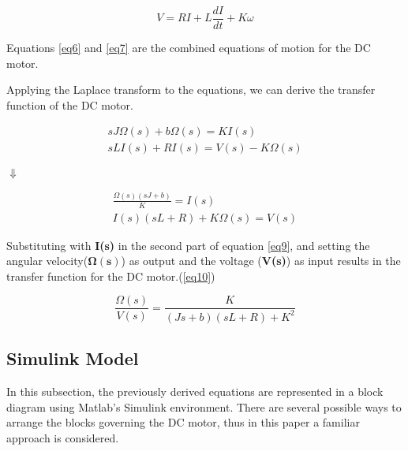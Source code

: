 \begin{equation} \label{eq7}
V = RI + L\frac{dI}{dt} + K\omega
\end{equation}

Equations \ref{eq6} and \ref{eq7} are the combined equations of motion for the DC motor.

Applying the Laplace transform to the equations, we can derive the transfer function of the DC motor.

\begin{align}  
sJ\Omega(s) + b\Omega(s) = KI(s) \label{eq8}\\
sLI(s) + RI(s) = V(s) - K\Omega(s) \nonumber
\end{align}

\begin{center}
$\Downarrow$
\end{center}

\begin{align} 
\frac{\Omega(s)(sJ + b)}{K} = I(s) \label{eq9} \\
I(s)(sL + R) + K\Omega(s) = V(s)  \nonumber 
\end{align}

Substituting with \textbf{I(s)} in the second part of equation \ref{eq9}, and setting the angular velocity($\boldsymbol{\Omega(s)}$) as output and the voltage (\textbf{V(s)}) as input results in the transfer function for the DC motor.(\ref{eq10})

\begin{equation} \label{eq10}
\frac{\Omega(s)}{V(s)} = \frac{K}{(Js + b)(sL + R) + K^2}
\end{equation}

\subsection{Simulink Model} \label{dc_model}

In this subsection, the previously derived equations are represented in a block diagram using Matlab's Simulink environment. There are several possible ways to arrange the blocks governing the DC motor, thus in this paper a familiar approach is considered.

